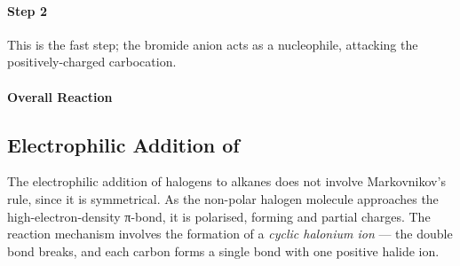 
			\paragraph{Step 2}



			This is the fast step; the bromide anion acts as a nucleophile, attacking the positively-charged carbocation.


			\paragraph{Overall Reaction}




		\pagebreak

		\subsection{Electrophilic Addition of }

			The electrophilic addition of halogens to alkanes does not involve Markovnikov's rule, since it is symmetrical.
			As the non-polar halogen molecule approaches the high-electron-density π-bond, it is polarised, forming
			\deltap{} and \deltam{} partial charges. The reaction mechanism involves the formation of a \textit{cyclic halonium ion} --- the
			double bond breaks, and each carbon forms a single bond with one positive halide ion.

